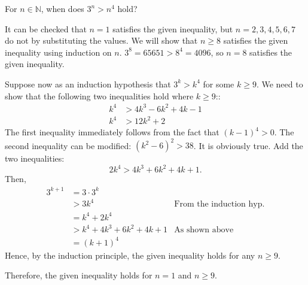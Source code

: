 \documentclass[../main.tex]{subfiles}
\begin{document}
\begin{exercise}
    For $n \in \mathbb N$, when does $3^n > n^4$ hold?
\end{exercise}
\begin{sol}
    It can be checked that $n = 1$ satisfies the given inequality, but $n = 2, 3, 4, 5, 6, 7$ do not by substituting the values.
    We will show that $n \geq 8$ satisfies the given inequality using induction on $n$.
    $3^8 = 65651 > 8^4 = 4096$, so $n = 8$ satisfies the given inequality.

    Suppose now as an induction hypothesis that $3^k > k^4$ for some $k \geq 9$.
    We need to show that the following two inequalities hold where $k \geq 9$::
    \begin{align*}
        k^4 &> 4k^3 - 6k^2 + 4k - 1\\
        k^4 &> 12k^2 + 2
    \end{align*}
    The first inequality immediately follows from the fact that $(k - 1)^4 > 0$.
    The second inequality can be modified: $(k^2 - 6)^2 > 38$.
    It is obviously true.
    Add the two inequalities:
    \[
        2k^4 > 4k^3 + 6k^2 + 4k + 1.
    \]
    Then,
    \begin{align*}
        3^{k + 1} &= 3 \cdot 3^k\\
                  &> 3k^4 &\text{From the induction hyp.}\\
                  &= k^4 + 2k^4\\
                  &> k^4 + 4k^3 + 6k^2 + 4k + 1 &\text{As shown above}\\
                  &= (k + 1)^4
    \end{align*}
    Hence, by the induction principle, the given inequality holds for any $n \geq 9$.

    Therefore, the given inequality holds for $n = 1$ and $n \geq 9$.
\end{sol}
\end{document}
